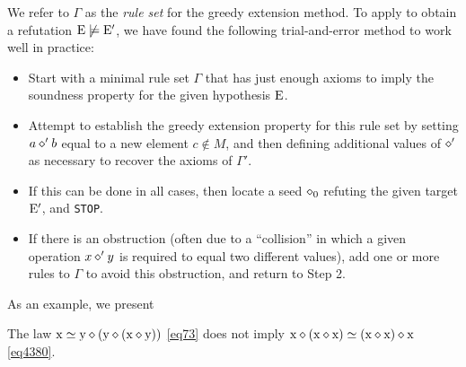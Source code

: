 We refer to $\Gamma$ as the \emph{rule set} for the greedy extension method. To apply  to obtain a refutation $\mathrm{E} \not\models {\mathrm{E}'}$, we have found the following trial-and-error method to work well in practice:
\begin{itemize}
\item[1.] Start with a minimal rule set $\Gamma$ that has just enough axioms to imply the soundness property for the given hypothesis $\mathrm{E}$.
\item[2.] Attempt to establish the greedy extension property for this rule set by setting $a \diamond' b$ equal to a new element $c \not \in M$, and then defining additional values of $\diamond'$ as necessary to recover the axioms of $\Gamma'$.
\item[3.]  If this can be done in all cases, then locate a seed $\diamond_0$ refuting the given target ${\mathrm{E}'}$, and \texttt{STOP}.
\item[4.]  If there is an obstruction (often due to a ``collision'' in which a given operation $x \diamond' y$ is required to equal two different values), add one or more rules to $\Gamma$ to avoid this obstruction, and return to Step 2.
\end{itemize}

As an example, we present

\begin{proposition}[$\Eq{73} \nmodels \Eq{4380}$]\label{73-4380} The law $\mathrm{x} \simeq \mathrm{y} \diamond (\mathrm{y} \diamond (\mathrm{x} \diamond \mathrm{y}))$ \eqref{eq73} does not imply $\mathrm{x} \diamond (\mathrm{x} \diamond \mathrm{x}) \simeq (\mathrm{x} \diamond \mathrm{x}) \diamond \mathrm{x}$ \eqref{eq4380}.
\end{proposition}

